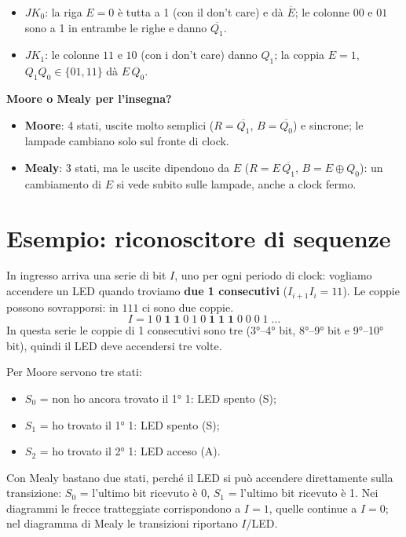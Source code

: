 \begin{itemize}[leftmargin=1.5em, itemsep=2pt]
    \item $JK_0$: la riga $E=0$ è tutta a 1 (con il don't care) e dà $\overline{E}$; le
          colonne $00$ e $01$ sono a 1 in entrambe le righe e danno $\overline{Q_1}$.
    \item $JK_1$: le colonne $11$ e $10$ (con i don't care) danno $Q_1$; la coppia
          $E=1$, $Q_1Q_0\in\{01, 11\}$ dà $E\,Q_0$.
\end{itemize}

\begin{important}
\textbf{Moore o Mealy per l'insegna?}
\begin{itemize}[leftmargin=1.3em, itemsep=2pt]
    \item \textbf{Moore}: 4 stati, uscite molto semplici ($R=\overline{Q_1}$,
          $B=\overline{Q_0}$) e sincrone; le lampade cambiano solo sul fronte di clock.
    \item \textbf{Mealy}: 3 stati, ma le uscite dipendono da $E$ ($R=E\,\overline{Q_1}$,
          $B=E\oplus Q_0$): un cambiamento di $E$ si vede subito sulle lampade, anche a
          clock fermo.
\end{itemize}
\end{important}

\section{Esempio: riconoscitore di sequenze}

In ingresso arriva una serie di bit $I$, uno per ogni periodo di clock: vogliamo accendere
un LED quando troviamo \textbf{due 1 consecutivi} ($I_{i+1}I_i=11$). Le coppie possono
sovrapporsi: in $111$ ci sono due coppie.
\[
I = 1\;0\;\mathbf{1\;1}\;0\;1\;0\;\mathbf{1\;1\;1}\;0\;0\;0\;1\;\ldots
\]
In questa serie le coppie di 1 consecutivi sono tre (3°--4° bit, 8°--9° bit e 9°--10° bit),
quindi il LED deve accendersi tre volte.

\noindent Per Moore servono tre stati:
\begin{itemize}[leftmargin=1.5em, itemsep=1pt]
    \item $S_0$ = non ho ancora trovato il 1° 1: LED spento (S);
    \item $S_1$ = ho trovato il 1° 1: LED spento (S);
    \item $S_2$ = ho trovato il 2° 1: LED acceso (A).
\end{itemize}
Con Mealy bastano due stati, perché il LED si può accendere direttamente sulla
transizione: $S_0$ = l'ultimo bit ricevuto è 0, $S_1$ = l'ultimo bit ricevuto è 1.
Nei diagrammi le frecce tratteggiate corrispondono a $I=1$, quelle continue a $I=0$; nel
diagramma di Mealy le transizioni riportano $I$/LED.

